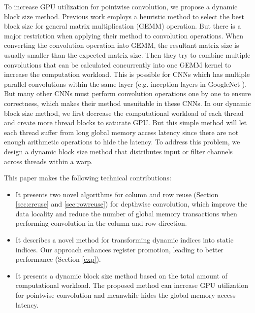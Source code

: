 To increase GPU utilization for pointwise convolution, we propose a dynamic block size method. 
Previous work \cite{li2019coordinated} employs a heuristic method to select the best block size for general matrix multiplication (GEMM) operation. 
But there is a major restriction when applying their method to convolution operations.
When converting the convolution operation into GEMM, the resultant matrix size is usually smaller than the expected matrix size.
Then they try to combine multiple convolutions that can be calculated concurrently into one GEMM kernel to increase the computation workload.
This is possible for CNNs which has multiple parallel convolutions within the same layer (e.g. inception layers in GoogleNet \cite{szegedy2015going}).
But many other CNNs must perform convolution operations one by one to ensure correctness, which makes their method unsuitable in these CNNs.
In our dynamic block size method, we first decrease the computational workload of each thread and create more thread blocks to saturate GPU. 
But this simple method will let each thread suffer from long global memory access latency since there are not enough arithmetic operations to hide the latency.
To address this problem, we design a dynamic block size method that distributes input or filter channels across threads within a warp. 

This paper makes the following technical contributions:
\begin{itemize}
    \item It presents two novel algorithms for column and row reuse (Section \ref{sec:creuse} and \ref{sec:rowreuse}) for depthwise convolution, which improve the data locality and reduce the number of global memory transactions when performing convolution in the column and row direction.
    \item It describes a novel method for transforming dynamic indices into static indices. 
    Our approach enhances register promotion, leading to better performance (Section \ref{exp}).
    \item It presents a dynamic block size method based on the total amount of computational workload. The proposed method can increase GPU utilization for pointwise convolution and meanwhile hides the global memory access latency. 
\end{itemize}
